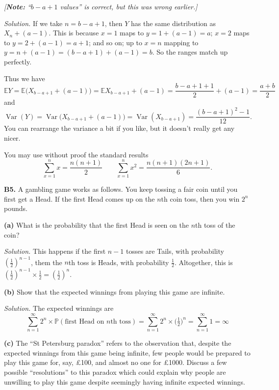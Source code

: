 \documentclass[
  a4paper,
]{book}
\theoremstyle{definition}
\theoremstyle{definition}
\theoremstyle{definition}
\theoremstyle{definition}
\theoremstyle{remark}
\begin{document}
\emph{{[}\textbf{Note:} ``\(b - a + 1\) values'' is correct, but this was wrong earlier.{]}}

\begin{myanswers}
\emph{Solution.} If we take \(n = b - a + 1\), then \(Y\) has the same distribution as \(X_n + (a-1)\). This is because \(x = 1\) maps to \(y = 1 + (a-1) = a\); \(x = 2\) maps to \(y = 2 + (a-1) = a+1\); and so on; up to \(x = n\) mapping to \(y = n + (a-1) = (b - a + 1) + (a-1) = b\). So the ranges match up perfectly.

Thus we have
\[ \mathbb EY = \mathbb E\big(X_{b-a+1} + (a-1)\big) = \mathbb EX_{b-a+1} + (a-1)= \frac{b - a + 1 +1}{2} + (a-1) = \frac{a + b}{2}  \]
and
\[ \operatorname{Var}(Y) = \operatorname{Var}\big(X_{b-a+1} + (a-1)\big) = \operatorname{Var}(X_{b-a+1}) = \frac{(b - a + 1)^2 - 1}{12} . \]
You can rearrange the variance a bit if you like, but it doesn't really get any nicer.

\end{myanswers}

You may use without proof the standard results
\[ \sum_{x=1}^n x = \frac{n(n+1)}{2} \qquad  \sum_{x=1}^n x^2 = \frac{n(n+1)(2n+1)}{6} . \]

\textbf{B5.} A gambling game works as follows. You keep tossing a fair coin until you first get a Head. If the first Head comes up on the \(n\)th coin toss, then you win \(2^n\) pounds.

\textbf{(a)} What is the probability that the first Head is seen on the \(n\)th toss of the coin?

\begin{myanswers}
\emph{Solution.}
This happens if the first \(n-1\) tosses are Tails, with probability \((\frac12)^{n-1}\), them the \(n\)th toss is Heads, with probability \(\frac12\). Altogether, this is \((\frac12)^{n-1}\times \frac12 = (\frac12)^n\).

\end{myanswers}

\textbf{(b)} Show that the expected winnings from playing this game are infinite.

\begin{myanswers}
\emph{Solution.}
The expected winnings are
\[ \sum_{n=1}^\infty 2^n \times \mathbb P(\text{first Head on $n$th toss}) = \sum_{n=1}^\infty 2^n \times \big(\tfrac12\big)^n = \sum_{n=1}^\infty 1 = \infty \]

\end{myanswers}

\textbf{(c)} The ``St Petersburg paradox'' refers to the observation that, despite the expected winnings from this game being infinite, few people would be prepared to play this game for, say, £100, and almost no one for £1000. Discuss a few possible ``resolutions'' to this paradox which could explain why people are unwilling to play this game despite seemingly having infinite expected winnings.
\end{document}
